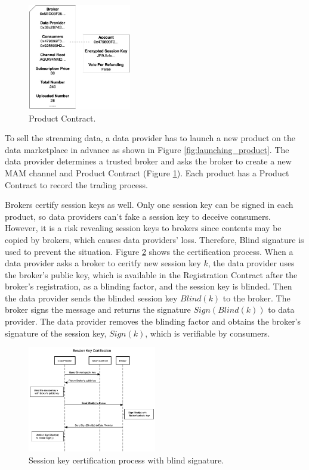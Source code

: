 \documentclass[journal,10pt,a4paper]{IEEEtran}
\begin{document}
\begin{figure}[h]
    \centering
    \includegraphics[width=0.4\textwidth]{product_contract}
    \caption{Product Contract.}
    \label{fig:product_contract}
\end{figure}

To sell the streaming data, a data provider has to launch a new product on the data marketplace in advance as shown in Figure \ref{fig:launching_product}. The data provider determines a trusted broker and asks the broker to create a new MAM channel and Product Contract (Figure \ref{fig:product_contract}). Each product has a Product Contract to record the trading process.

Brokers certify session keys as well. Only one session key can be signed in each product, so data providers can't fake a session key to deceive consumers. However, it is a risk revealing session keys to brokers since contents may be copied by brokers, which causes data providers' loss. Therefore, Blind signature is used to prevent the situation. Figure \ref{fig:key_certification} shows the certification process. When a data provider asks a broker to ceritfy new session key $k$, the data provider uses the broker's public key, which is available in the Registration Contract after the broker's registration, as a blinding factor, and the session key is blinded. Then the data provider sends the blinded session key $Blind(k)$ to the broker. The broker signs the message and returns the signature $Sign(Blind(k))$ to data provider. The data provider removes the blinding factor and obtains the broker's signature of the session key, $Sign(k)$, which is verifiable by consumers.

\begin{figure}[h]
    \centering
    \includegraphics[width=0.5\textwidth]{key_certification}
    \caption{Session key certification process with blind signature.}
    \label{fig:key_certification}
\end{figure}
\end{document}
